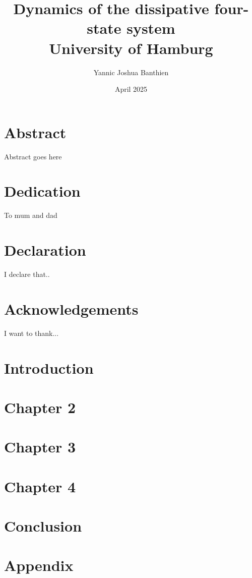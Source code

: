 \documentclass[11pt]{report}
\title{
{Dynamics of the dissipative four-state system}\\
{\large University of Hamburg}\\
}
\author{Yannic Joshua Banthien}
\date{April 2025}
\begin{document}
\maketitle

\chapter*{Abstract}
Abstract goes here

\chapter*{Dedication}
To mum and dad

\chapter*{Declaration}
I declare that..

\chapter*{Acknowledgements}
I want to thank...

\tableofcontents

\chapter{Introduction}


\chapter{Chapter 2}


\chapter{Chapter 3}


\chapter{Chapter 4}


\chapter{Conclusion}


\appendix
\chapter{Appendix}

\end{document}
